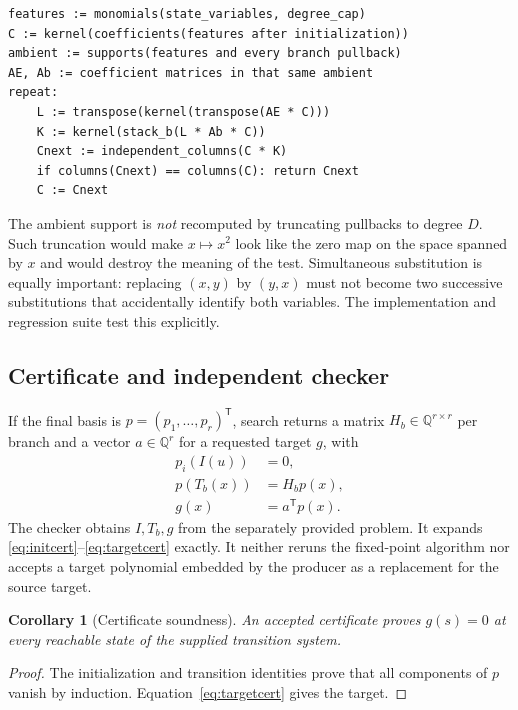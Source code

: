 \documentclass[11pt,letterpaper]{article}
\newcommand{\Q}{\mathbb Q}\newcommand{\R}{\mathbb R}\newcommand{\N}{\mathbb N}
\newtheorem{corollary}[theorem]{Corollary}
\theoremstyle{definition}\newtheorem{definition}[theorem]{Definition}
\theoremstyle{remark}\newtheorem{remark}[theorem]{Remark}
\begin{document}
\par\noindent\begin{minipage}{\linewidth}
\begin{lstlisting}
features := monomials(state_variables, degree_cap)
C := kernel(coefficients(features after initialization))
ambient := supports(features and every branch pullback)
AE, Ab := coefficient matrices in that same ambient
repeat:
    L := transpose(kernel(transpose(AE * C)))
    K := kernel(stack_b(L * Ab * C))
    Cnext := independent_columns(C * K)
    if columns(Cnext) == columns(C): return Cnext
    C := Cnext
\end{lstlisting}
\end{minipage}\par\smallskip

The ambient support is \emph{not} recomputed by truncating pullbacks to degree
$D$. Such truncation would make $x\mapsto x^2$ look like the zero map on the
space spanned by $x$ and would destroy the meaning of the test.
Simultaneous substitution is equally important: replacing $(x,y)$ by $(y,x)$
must not become two successive substitutions that accidentally identify both
variables. The implementation and regression suite test this explicitly.

\subsection{Certificate and independent checker}
If the final basis is $p=(p_1,\ldots,p_r)^\mathsf T$, search returns a matrix
$H_b\in\Q^{r\times r}$ per branch and a vector $a\in\Q^r$ for a requested
target $g$, with
\begin{align}
 p_i(I(u))&=0,\label{eq:initcert}\\
 p(T_b(x))&=H_bp(x),\label{eq:stepcert}\\
 g(x)&=a^\mathsf T p(x).\label{eq:targetcert}
\end{align}
The checker obtains $I,T_b,g$ from the separately provided problem. It expands
\eqref{eq:initcert}--\eqref{eq:targetcert} exactly. It neither reruns the
fixed-point algorithm nor accepts a target polynomial embedded by the producer
as a replacement for the source target.

\begin{corollary}[Certificate soundness]
An accepted certificate proves $g(s)=0$ at every reachable state of the supplied
transition system.
\end{corollary}
\begin{proof}
The initialization and transition identities prove that all components of $p$
vanish by induction. Equation~\eqref{eq:targetcert} gives the target.
\end{proof}
\end{document}
